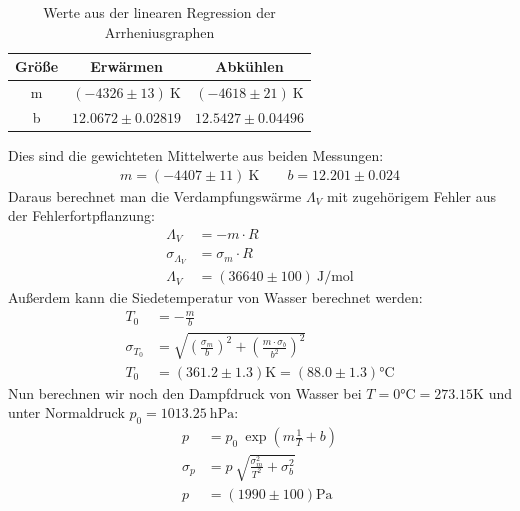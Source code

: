 \documentclass[12pt,a4paper,titlepage,headinclude,bibtotoc]{scrartcl}
\begin{document}
\begin{table}[!htb]
 \centering
 \begin{tabular}{|c|c|c|}
  \hline
  Größe&Erwärmen&Abkühlen\\
  \hline
  m & $(-4326 \pm 13)~\si{\kelvin}$ & $(-4618 \pm 21)~\si{\kelvin}$ \\
  b & $12.0672  \pm 0.02819$ & $12.5427 \pm 0.04496$ \\
  \hline
 \end{tabular}
 \caption{Werte aus der linearen Regression der Arrheniusgraphen} 
 \label{tab:regErg}
\end{table}

Dies sind die gewichteten Mittelwerte aus beiden Messungen:
\begin{align*}
 m=(-4407 \pm 11)~\si{\kelvin} \qquad
 b=12.201 \pm 0.024
\end{align*}
Daraus berechnet man die Verdampfungswärme $\Lambda_V$ mit zugehörigem Fehler aus der Fehlerfortpflanzung:
\begin{align*}
 \Lambda_V &= -m\cdot R\\
 \sigma_{\Lambda_V} &= \sigma_m \cdot R\\
 \Lambda_V&=(36640 \pm 100)~\si{\joule/\mol}
\end{align*}
Außerdem kann die Siedetemperatur von Wasser berechnet werden:
\begin{align*}
 T_0 &= -\frac{m}{b}\\
 \sigma_{T_0} &= \sqrt{\left(\frac{\sigma_m}{b}\right)^2+\left(\frac{m\cdot \sigma_b}{b^2}\right)^2}\\
 T_0 &= (361.2 \pm 1.3)\si{\kelvin} = (88.0 \pm 1.3)\si{\celsius}
\end{align*}
Nun berechnen wir noch den Dampfdruck von Wasser bei $T=0\si{\celsius}=273.15\si{\kelvin}$ und unter Normaldruck $p_0=1013.25~\si{\hecto \pascal}$:
\begin{align*}
 p &= p_0~\exp\left(m\frac{1}{T}+b\right)\\
 \sigma_p &= p~\sqrt{\frac{\sigma_m^2}{T^2}+\sigma_b^2}\\
 p &= (1990 \pm 100)\si{\pascal}
\end{align*}
\end{document}
